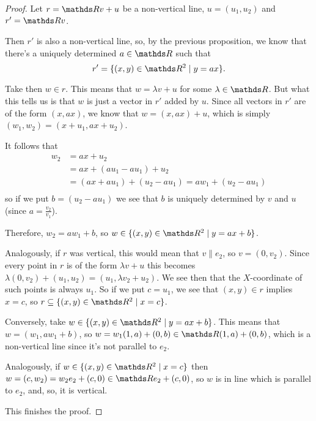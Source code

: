 \begin{proof}
	Let $r=\R v+u$ be a non-vertical line, $u=(u_1,u_2)$ and $r'=\R v$.
	
	Then $r'$ is also a non-vertical line, so, by the previous proposition, we know that there's a uniquely determined $a\in \R$ such that
	\[r'=\{(x,y)\in \R^2\mid y=ax\}.\]
	
	Take then $w\in r$. This means that $w=\lambda v+u$ for some $\lambda \in \R$. But what this tells us is that $w$ is just a vector in $r'$ added by $u$. Since all vectors in $r'$ are of the form $(x,ax)$, we know that $w=(x,ax)+u$, which is simply $(w_1,w_2)=(x+u_1,ax+u_2)$. 
	
	It follows that
	\begin{align*}
		w_2&=ax+u_2\\
		&=ax+(au_1-au_1)+u_2\\
		&=(ax+au_1)+(u_2-au_1)=aw_1+(u_2-au_1)\\
	\end{align*}so if we put $b=(u_2-au_1)$ we see that $b$ is uniquely determined by $v$ and $u$ (since $a=\frac{v_2}{v_1}$).
	
	Therefore, $w_2=aw_1+b$, so $w\in \{(x,y)\in \R^2\mid y=ax+b\}$.
	
	Analogously, if $r$ was vertical, this would mean that $v\parallel e_2$, so $v=(0,v_2)$. Since every point in $r$ is of the form $\lambda v+u$ this becomes $\lambda(0,v_2)+(u_1,u_2)=(u_1,\lambda v_2+u_2)$. We see then that the $X$-coordinate of such points is always $u_1$. So if we put $c=u_1$, we see that $(x,y)\in r$ implies $x=c$, so $r\subseteq\{(x,y)\in \R^2\mid x=c\}$.
	
	\bigskip
	Conversely, take $w\in \{(x,y)\in \R^2\mid y=ax+b\}$. This means that $w=(w_1,aw_1+b)$, so $w=w_1(1,a)+(0,b)\in \R (1,a)+(0,b)$, which is a non-vertical line since it's not parallel to $e_2$.
	
	Analogously, if $w\in \{(x,y)\in \R^2\mid x=c\}$ then $w=(c,w_2)=w_2e_2+(c,0)\in\R e_2+(c,0)$, so $w$ is in line which is parallel to $e_2$, and, so, it is vertical.
	
	This finishes the proof.
\end{proof}

